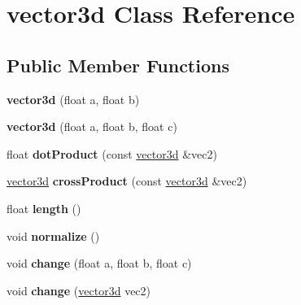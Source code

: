 \hypertarget{classvector3d}{\section{vector3d Class Reference}
\label{classvector3d}
}
\subsection*{Public Member Functions}
\begin{DoxyCompactItemize}
\item 
\hypertarget{classvector3d_a18e113e3777e535122da75ed849f1f41}{{\bfseries vector3d} (float a, float b)}\label{classvector3d_a18e113e3777e535122da75ed849f1f41}

\item 
\hypertarget{classvector3d_aa60806b10d24854b400f311abf3cb583}{{\bfseries vector3d} (float a, float b, float c)}\label{classvector3d_aa60806b10d24854b400f311abf3cb583}

\item 
\hypertarget{classvector3d_a53f3e170001b39506b6c186fa0408489}{float {\bfseries dot\+Product} (const \hyperlink{classvector3d}{vector3d} \&vec2)}\label{classvector3d_a53f3e170001b39506b6c186fa0408489}

\item 
\hypertarget{classvector3d_a4e4fc2ac9e4186a3eb8fb9d5db4f39b3}{\hyperlink{classvector3d}{vector3d} {\bfseries cross\+Product} (const \hyperlink{classvector3d}{vector3d} \&vec2)}\label{classvector3d_a4e4fc2ac9e4186a3eb8fb9d5db4f39b3}

\item 
\hypertarget{classvector3d_acbd5c8a8109501e6eeccdb5d423befe9}{float {\bfseries length} ()}\label{classvector3d_acbd5c8a8109501e6eeccdb5d423befe9}

\item 
\hypertarget{classvector3d_ace703d95b23f30f80ecfe5b2c8d7c323}{void {\bfseries normalize} ()}\label{classvector3d_ace703d95b23f30f80ecfe5b2c8d7c323}

\item 
\hypertarget{classvector3d_ac49c9a718c571bc6a29ba4f325e51f6f}{void {\bfseries change} (float a, float b, float c)}\label{classvector3d_ac49c9a718c571bc6a29ba4f325e51f6f}

\item 
\hypertarget{classvector3d_a55dd65c1321e0693a8d5e3db3c9fd0e3}{void {\bfseries change} (\hyperlink{classvector3d}{vector3d} vec2)}\label{classvector3d_a55dd65c1321e0693a8d5e3db3c9fd0e3}


\end{DoxyCompactItemize}
